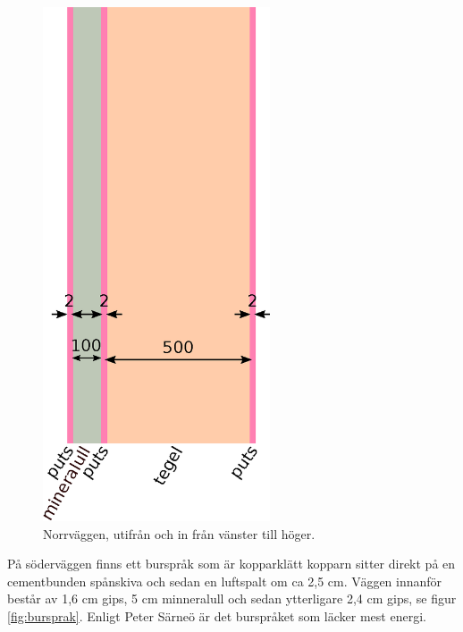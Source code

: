 \begin{figure}[hpbt]
\centering
\includegraphics[width=0.6\textwidth]{images/norrvagg.eps}
\caption{\label{fig:sodervagg}{Norrväggen, utifrån och in från vänster till höger.}}
\end{figure}

På söderväggen finns ett burspråk som är kopparklätt kopparn sitter direkt på en cementbunden spånskiva och sedan en luftspalt om ca 2,5 cm. Väggen innanför består av 1,6 cm gips, 5 cm minneralull och sedan ytterligare 2,4 cm gips, se figur \ref{fig:bursprak}.\cite{kandidatarbete2010} Enligt Peter Särneö\cite{petersarneo} är det burspråket som läcker mest energi.

